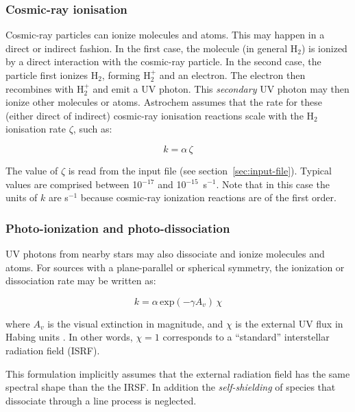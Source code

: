 \documentclass[a4paper,12pt]{article}
\begin{document}
\subsubsection{Cosmic-ray ionisation}
\label{sec:cosm-ray-ioniz}

Cosmic-ray particles can ionize molecules and atoms. This may happen
in a direct or indirect fashion. In the first case, the molecule (in
general H$_{2}$) is ionized by a direct interaction with the
cosmic-ray particle. In the second case, the particle first ionizes
H$_{2}$, forming H$_{2}^{+}$ and an electron. The electron then
recombines with H$_{2}^{+}$ and emit a UV photon. This
\emph{secondary} UV photon may then ionize other molecules or
atoms. Astrochem assumes that the rate for these (either direct of
indirect) cosmic-ray ionisation reactions scale with the H$_{2}$
ionisation rate $\zeta$, such as:

\begin{equation}
  k = \alpha  \, \zeta
  \label{eq:cosmic-ray-ionization}
\end{equation}

\noindent
The value of $\zeta$ is read from the input file (see
section~\ref{sec:input-file}). Typical values are comprised between
10$^{-17}$ and 10$^{-15}$~s$^{-1}$. Note that in this case the units
of $k$ are s$^{-1}$ because cosmic-ray ionization reactions are of the
first order.

\subsubsection{Photo-ionization and photo-dissociation}
\label{sec:photo-ioniz-photo}

UV photons from nearby stars may also dissociate and ionize molecules
and atoms. For sources with a plane-parallel or spherical symmetry,
the ionization or dissociation rate may be written as:

\begin{equation}
  k = \alpha \, \mathrm{exp} \left( -\gamma A_{v} \right) \, \chi
  \label{eq:photo-ionization}
\end{equation}

\noindent
where $A_{v}$ is the visual extinction in magnitude, and $\chi$ is the
external UV flux in Habing units \citep{Habing68}. In other words,
$\chi = 1$ corresponds to a ``standard'' interstellar radiation field
(ISRF).

This formulation implicitly assumes that the external radiation field
has the same spectral shape than the the IRSF. In addition the
\emph{self-shielding} of species that dissociate through a line
process \citep[e.g. CO;][]{vanDishoeck86} is neglected.
\end{document}
